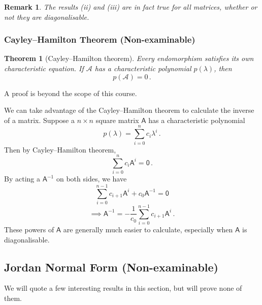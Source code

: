\documentclass{article}
\theoremstyle{plain}\theoremheaderfont{\normalfont\itshape}\theorembodyfont{\rmfamily}\theoremseparator{.}\newtheorem*{rem}{Remark}\newtheorem*{ex}{Example}\newtheorem*{proof}{Proof}\newtheorem*{altp}{Alternative proof}
\theoremstyle{plain}\theoremheaderfont{\normalfont\bfseries}\theorembodyfont{\rmfamily}\theoremseparator{.}\newtheorem{thm}{Theorem}[section]\newtheorem{lem}[thm]{Lemma}\newtheorem{prop}[thm]{Proposition}\newtheorem*{cor}{Corollary}\newtheorem{defn}[thm]{Definition}\newtheorem{clm}[thm]{Claim}\newtheorem{clminproof}{Claim}
\theoremstyle{break}\theoremheaderfont{\normalfont\itshape}\theorembodyfont{\rmfamily}\theoremseparator{.\medskip}\newtheorem*{proofskip}{Proof}\newtheorem*{exs}{Examples}\newtheorem*{rems}{Remarks}
\theoremstyle{break}\theoremheaderfont{\normalfont\bfseries}\theorembodyfont{\rmfamily}\theoremseparator{.\medskip}\newtheorem{lemskip}[thm]{Lemma}\newtheorem{defnskip}[thm]{Definition}\newtheorem{propskip}[thm]{Proposition}\newtheorem{thmskip}[thm]{Theorem}
\numberwithin{equation}{section}
\begin{document}
	\begin{rem}
		The results (ii) and (iii) are in fact true for all matrices, whether or not they are diagonalisable.
	\end{rem}
	\subsubsection{Cayley--Hamilton Theorem (Non-examinable)}
	\begin{thm}[Cayley--Hamilton theorem]
		Every endomorphism satisfies its own characteristic equation. If \(\mathcal{A}\) has a characteristic polynomial \(p(\lambda)\), then
		\[p(\mathcal{A})=0\,.\]
	\end{thm}
	A proof is beyond the scope of this course.
	
	We can take advantage of the Cayley--Hamilton theorem to calculate the inverse of a matrix. Suppose a \(n\times n\) square matrix \(\mathsf{A}\) has a characteristic polynomial
	\[p(\lambda)=\sum_{i=0}^{n}c_i\lambda^i\,.\]
	Then by Cayley--Hamilton theorem,
	\[\sum_{i=0}^{n}c_i\mathsf{A}^i=\mathsf{0}\,.\]
	By acting a \(\mathsf{A}^{-1}\) on both sides, we have
	\[\sum_{i=0}^{n-1}c_{i+1}\mathsf{A}^i+c_0\mathsf{A}^{-1}=\mathsf{0}\]
	\[\implies\mathsf{A}^{-1}=-\frac{1}{c_0}\sum_{i=0}^{n-1}c_{i+1}\mathsf{A}^i\,.\]
	These powers of \(\mathsf{A}\) are generally much easier to calculate, especially when \(\mathsf{A}\) is diagonalisable.
	\subsection{Jordan Normal Form (Non-examinable)}
	We will quote a few interesting results in this section, but will prove none of them.
\end{document}
